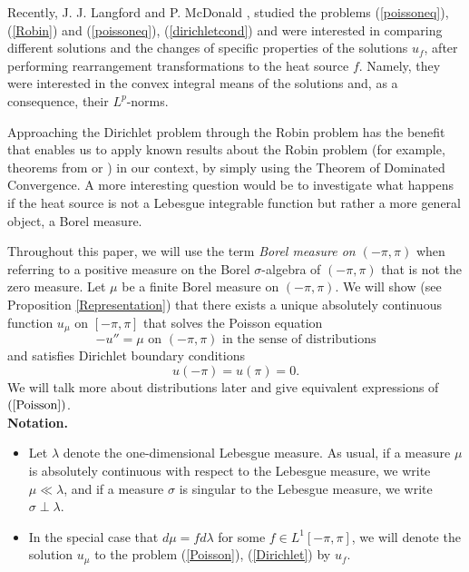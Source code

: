 \documentclass[11pt]{amsart}
\numberwithin{equation}{section}
\begin{document}
\par Recently, J. J. Langford and P. McDonald \cite{Langford}, studied the problems (\ref{poissoneq}), (\ref{Robin}) and (\ref{poissoneq}), (\ref{dirichletcond}) and were interested in comparing different solutions and the changes of specific properties of the solutions \(u_f\), after performing rearrangement transformations to the heat source \(f\). Namely, they were interested in the convex integral means of the solutions and, as a consequence, their \(L^p\)-norms.
\par Approaching the Dirichlet problem through the Robin problem has the benefit that enables us to apply known results about the Robin problem (for example, theorems from \cite{Langford} or \cite{egw}) in our context, by simply using the Theorem of Dominated Convergence. A more interesting question would be to investigate what happens if the heat source is not a Lebesgue integrable function but rather a more general object, a Borel measure.
\par Throughout this paper, we will use the term \textit{Borel measure on \((-\pi,\pi)\)} when referring to a positive measure on the Borel \(\sigma\)-algebra of \((-\pi,\pi)\) that is not the zero measure. Let \(\mu\) be a finite Borel measure on \((-\pi,\pi)\). We will show (see Proposition \ref{Representation}) that there exists a unique absolutely continuous function \(u_\mu\) on \([-\pi,\pi]\) that solves the Poisson equation
\begin{equation}\label{Poisson}
    -u''=\mu \text{ on \((-\pi,\pi)\) in the sense of distributions}
\end{equation}
and satisfies Dirichlet boundary conditions
\begin{equation}\label{Dirichlet}
    u(-\pi)=u(\pi)=0.
\end{equation}
We will talk more about distributions later and give equivalent expressions of \((\ref{Poisson})\).\\
\noindent
\textbf{Notation.}
\begin{itemize}
    \item Let \(\lambda\) denote the one-dimensional Lebesgue measure. As usual, if a measure \(\mu\) is absolutely continuous with respect to the Lebesgue measure, we write \(\mu\ll\lambda\), and if a measure \(\sigma\) is singular to the Lebesgue measure, we write \(\sigma\perp\lambda\).
    \item In the special case that \(d\mu=fd\lambda\) for some \(f\in L^1[-\pi,\pi]\), we will denote the solution \(u_\mu\) to the problem (\ref{Poisson}), (\ref{Dirichlet}) by \(u_f\).
\end{itemize}
\end{document}
